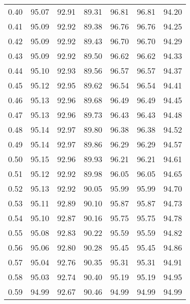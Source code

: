 \begin{tabular}{|c|c|c|c|c|c|c|}
      0.40 &     95.07 &     92.91 &      89.31 &   96.81 &      96.81 &         94.20 \\
      0.41 &     95.09 &     92.92 &      89.38 &   96.76 &      96.76 &         94.25 \\
      0.42 &     95.09 &     92.92 &      89.43 &   96.70 &      96.70 &         94.29 \\
      0.43 &     95.09 &     92.92 &      89.50 &   96.62 &      96.62 &         94.33 \\
      0.44 &     95.10 &     92.93 &      89.56 &   96.57 &      96.57 &         94.37 \\
      0.45 &     95.12 &     92.95 &      89.62 &   96.54 &      96.54 &         94.41 \\
      0.46 &     95.13 &     92.96 &      89.68 &   96.49 &      96.49 &         94.45 \\
      0.47 &     95.13 &     92.96 &      89.73 &   96.43 &      96.43 &         94.48 \\
      0.48 &     95.14 &     92.97 &      89.80 &   96.38 &      96.38 &         94.52 \\
      0.49 &     95.14 &     92.97 &      89.86 &   96.29 &      96.29 &         94.57 \\
      0.50 &     95.15 &     92.96 &      89.93 &   96.21 &      96.21 &         94.61 \\
      0.51 &     95.12 &     92.92 &      89.98 &   96.05 &      96.05 &         94.65 \\
      0.52 &     95.13 &     92.92 &      90.05 &   95.99 &      95.99 &         94.70 \\
      0.53 &     95.11 &     92.89 &      90.10 &   95.87 &      95.87 &         94.73 \\
      0.54 &     95.10 &     92.87 &      90.16 &   95.75 &      95.75 &         94.78 \\
      0.55 &     95.08 &     92.83 &      90.22 &   95.59 &      95.59 &         94.82 \\
      0.56 &     95.06 &     92.80 &      90.28 &   95.45 &      95.45 &         94.86 \\
      0.57 &     95.04 &     92.76 &      90.35 &   95.31 &      95.31 &         94.91 \\
      0.58 &     95.03 &     92.74 &      90.40 &   95.19 &      95.19 &         94.95 \\
      0.59 &     94.99 &     92.67 &      90.46 &   94.99 &      94.99 &         94.99 \\

\end{tabular}
